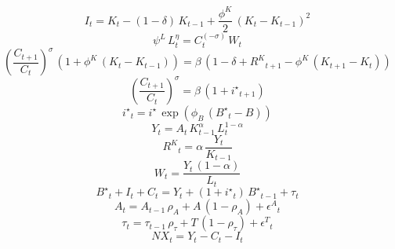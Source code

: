 \noindent[name= `Ley acumu. del capital']
\begin{dmath}
{I}_{t}={K}_{t}-\left(1-{\delta}\right)\, {K}_{t-1}+\frac{{\phi^{K}}}{2}\, \left({K}_{t}-{K}_{t-1}\right)^{2}
\end{dmath}
\noindent[name= `Oferta de trabajo']
\begin{dmath}
{\psi^L}\, {L}_{t}^{{\eta}}={C}_{t}^{\left(-{\sigma}\right)}\, {W}_{t}
\end{dmath}
\noindent[name= `Ecuación de Euler']
\begin{dmath}
\left(\frac{{C}_{t+1}}{{C}_{t}}\right)^{{\sigma}}\, \left(1+{\phi^{K}}\, \left({K}_{t}-{K}_{t-1}\right)\right)={\beta}\, \left(1-{\delta}+{R^{K}}_{t+1}-{\phi^{K}}\, \left({K}_{t+1}-{K}_{t}\right)\right)
\end{dmath}
\noindent[name= `Demanda de bonos']
\begin{dmath}
\left(\frac{{C}_{t+1}}{{C}_{t}}\right)^{{\sigma}}={\beta}\, \left(1+{i^{\star}}_{t+1}\right)
\end{dmath}
\noindent[name= `Tasa de interés deuda']
\begin{dmath}
{i^{\star}}_{t}={i^{\star}}\, \exp\left({\phi_{B}}\, \left({B^{\star}}_{t}-{B}\right)\right)
\end{dmath}
\noindent[name= `Función de producción']
\begin{dmath}
{Y}_{t}={A}_{t}\, {K}_{t-1}^{{\alpha}}\, {L}_{t}^{1-{\alpha}}
\end{dmath}
\noindent[name= `Demanda de capital']
\begin{dmath}
{R^{K}}_{t}={\alpha}\, \frac{{Y}_{t}}{{K}_{t-1}}
\end{dmath}
\noindent[name= `Demanda de trabajo']
\begin{dmath}
{W}_{t}=\frac{{Y}_{t}\, \left(1-{\alpha}\right)}{{L}_{t}}
\end{dmath}
\noindent[name= `Demanda agregada']
\begin{dmath}
{B^{\star}}_{t}+{I}_{t}+{C}_{t}={Y}_{t}+\left(1+{i^{\star}}_{t}\right)\, {B^{\star}}_{t-1}+{\tau}_{t}
\end{dmath}
\noindent[name= `Productividad']
\begin{dmath}
{A}_{t}={A}_{t-1}\, {\rho_{A}}+{A}\, \left(1-{\rho_{A}}\right)+{\epsilon^{A}}_{t}
\end{dmath}
\noindent[name= `Transferencias']
\begin{dmath}
{\tau}_{t}={\tau}_{t-1}\, {\rho_{\tau}}+{T}\, \left(1-{\rho_{\tau}}\right)+{\epsilon^{T}}_{t}
\end{dmath}
\noindent[name= `Exportaciones netas']
\begin{dmath}
{NX}_{t}={Y}_{t}-{C}_{t}-{I}_{t}
\end{dmath}
